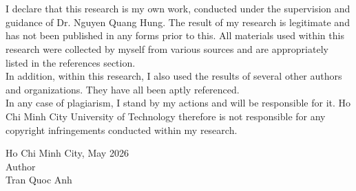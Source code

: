 \documentclass[oneside,a4paper,12pt]{book}
\begin{document}
	\frontmatter
	
	\chapter*{}
	I declare that this research is my own work, conducted under the supervision and guidance of Dr. Nguyen Quang Hung. The result of my research is legitimate and has not been published in any forms prior to this. All materials used within this research were collected by myself from various sources and are appropriately listed in the references section. \\
	
	In addition, within this research, I also used the results of several other authors and organizations. They have all been aptly referenced. \\
	
	In any case of plagiarism, I stand by my actions and will be responsible for it. Ho Chi Minh City University of Technology therefore is not responsible for any copyright infringements conducted within my research. \\[20pt]
	\begin{flushright}
		Ho Chi Minh City, May 2026 \\
		Author \\
		Tran Quoc Anh \\
	\end{flushright}
%	
%	
\end{document}
